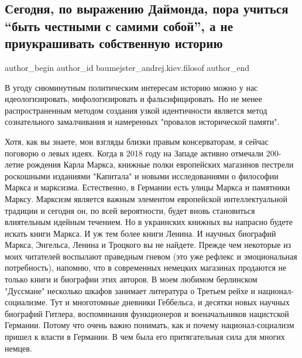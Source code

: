  
 
 
 
 
 
\subsection{Сегодня, по выражению Даймонда, пора учиться \enquote{быть честными с самими собой}, а не приукрашивать собственную историю}
\label{sec:13_09_2021.fb.baumejster_andrej.kiev.filosof.1.filosofia_istoria_socializm_marks}
 
\ifcmt
 author_begin
   author_id baumejster_andrej.kiev.filosof
 author_end
\fi

В угоду сиюминутным политическим интересам историю можно у нас
идеологизировать, мифологизировать и фальсифицировать. Но не менее
распространенным методом создания узкой идентичности является метод
сознательного замалчивания и намеренных "провалов исторической памяти". 

Хотя, как вы знаете, мои взгляды близки правым консерваторам, я сейчас поговорю
о левых идеях. Когда в 2018 году на Западе активно отмечали 200-летие рождения
Карла Маркса, книжные полки европейских магазинов пестрели роскошными изданиями
"Капитала" и новыми исследованиями о философии Маркса и марксизма. Естественно,
в Германии есть улицы Маркса и памятники Марксу. Марксизм является важным
элементом европейской интеллектуальной традиции и сегодня он, по всей
вероятности, будет вновь становиться влиятельным идейным течением. Но в
украинских книжных вы напрасно будете искать книги Маркса. И уж тем более книги
Ленина. И научных биографий Маркса, Энгельса, Ленина и Троцкого вы не найдете.
Прежде чем некоторые из моих читателей воспылают праведным гневом (это уже
рефлекс и эмоциональная потребность), напомню, что в современных немецких
магазинах продаются не только книги и биографии этих авторов. В моем любимом
берлинском "Дуссмане" несколько шкафов занимает литература о Третьем рейхе и
национал-социализме. Тут и многотомные дневники Геббельса, и десятки новых
научных биографий Гитлера, воспоминания функционеров и военачальников
нацистской Германии. Потому что очень важно понимать, как и почему
национал-социализм пришел к власти в Германии. В чем была его притягательная
сила для многих немцев. 

